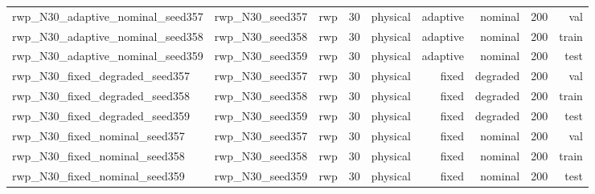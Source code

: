 \begin{tabular}{lrrrrrrrr}
rwp\_N30\_adaptive\_nominal\_seed357 & rwp\_N30\_seed357 & rwp & 30 & physical & adaptive & nominal & 200 & val \\
rwp\_N30\_adaptive\_nominal\_seed358 & rwp\_N30\_seed358 & rwp & 30 & physical & adaptive & nominal & 200 & train \\
rwp\_N30\_adaptive\_nominal\_seed359 & rwp\_N30\_seed359 & rwp & 30 & physical & adaptive & nominal & 200 & test \\
rwp\_N30\_fixed\_degraded\_seed357 & rwp\_N30\_seed357 & rwp & 30 & physical & fixed & degraded & 200 & val \\
rwp\_N30\_fixed\_degraded\_seed358 & rwp\_N30\_seed358 & rwp & 30 & physical & fixed & degraded & 200 & train \\
rwp\_N30\_fixed\_degraded\_seed359 & rwp\_N30\_seed359 & rwp & 30 & physical & fixed & degraded & 200 & test \\
rwp\_N30\_fixed\_nominal\_seed357 & rwp\_N30\_seed357 & rwp & 30 & physical & fixed & nominal & 200 & val \\
rwp\_N30\_fixed\_nominal\_seed358 & rwp\_N30\_seed358 & rwp & 30 & physical & fixed & nominal & 200 & train \\
rwp\_N30\_fixed\_nominal\_seed359 & rwp\_N30\_seed359 & rwp & 30 & physical & fixed & nominal & 200 & test \\
\bottomrule
\end{tabular}